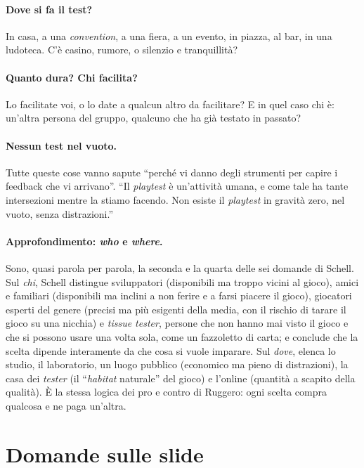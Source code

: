\paragraph{Dove si fa il test?} In casa, a una \emph{convention}, a una fiera, a un
evento, in piazza, al bar, in una ludoteca. C'è casino, rumore, o silenzio e
tranquillità?

\paragraph{Quanto dura? Chi facilita?} Lo facilitate voi, o lo date a qualcun altro da
facilitare? E in quel caso chi è: un'altra persona del gruppo, qualcuno che ha già
testato in passato?

\paragraph{Nessun test nel vuoto.} Tutte queste cose vanno sapute ``perché vi danno
degli strumenti per capire i feedback che vi arrivano''. ``Il \emph{playtest} è
un'attività umana, e come tale ha tante intersezioni mentre la stiamo facendo. Non
esiste il \emph{playtest} in gravità zero, nel vuoto, senza distrazioni.''

\paragraph{Approfondimento: \emph{who} e \emph{where}.} Sono, quasi parola per parola, la
seconda e la quarta delle sei domande di Schell. Sul \emph{chi}, Schell distingue
sviluppatori (disponibili ma troppo vicini al gioco), amici e familiari (disponibili ma
inclini a non ferire e a farsi piacere il gioco), giocatori esperti del genere (precisi
ma più esigenti della media, con il rischio di tarare il gioco su una nicchia) e
\emph{tissue tester}, persone che non hanno mai visto il gioco e che si possono usare una
volta sola, come un fazzoletto di carta; e conclude che la scelta dipende interamente da
che cosa si vuole imparare. Sul \emph{dove}, elenca lo studio, il laboratorio, un luogo
pubblico (economico ma pieno di distrazioni), la casa dei \emph{tester} (il ``\emph{habitat}
naturale'' del gioco) e l'online (quantità a scapito della qualità). È la stessa logica
dei pro e contro di Ruggero: ogni scelta compra qualcosa e ne paga un'altra.

\section{Domande sulle slide}
\label{a12:sec:domande}

